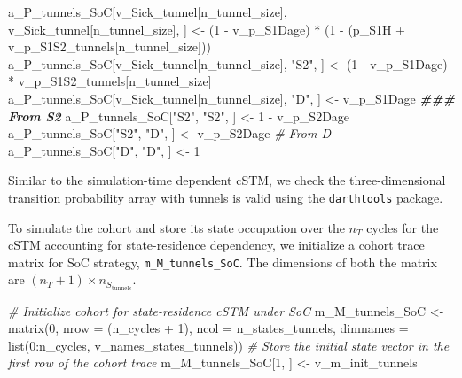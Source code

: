 \documentclass[
]{article}
\newenvironment{Shaded}{\begin{snugshade}}{\end{snugshade}}
\newcommand{\AttributeTok}[1]{\textcolor[rgb]{0.77,0.63,0.00}{#1}}
\newcommand{\CommentTok}[1]{\textcolor[rgb]{0.56,0.35,0.01}{\textit{#1}}}
\newcommand{\DecValTok}[1]{\textcolor[rgb]{0.00,0.00,0.81}{#1}}
\newcommand{\DocumentationTok}[1]{\textcolor[rgb]{0.56,0.35,0.01}{\textbf{\textit{#1}}}}
\newcommand{\FunctionTok}[1]{\textcolor[rgb]{0.00,0.00,0.00}{#1}}
\newcommand{\NormalTok}[1]{#1}
\newcommand{\OtherTok}[1]{\textcolor[rgb]{0.56,0.35,0.01}{#1}}
\newcommand{\SpecialCharTok}[1]{\textcolor[rgb]{0.00,0.00,0.00}{#1}}
\newcommand{\StringTok}[1]{\textcolor[rgb]{0.31,0.60,0.02}{#1}}
\begin{document}
\begin{Shaded}
\begin{Highlighting}[]
\NormalTok{a\_P\_tunnels\_SoC[v\_Sick\_tunnel[n\_tunnel\_size],}
\NormalTok{                v\_Sick\_tunnel[n\_tunnel\_size], ] }\OtherTok{\textless{}{-}}\NormalTok{ (}\DecValTok{1} \SpecialCharTok{{-}}\NormalTok{ v\_p\_S1Dage) }\SpecialCharTok{*}
\NormalTok{                                                   (}\DecValTok{1} \SpecialCharTok{{-}}\NormalTok{ (p\_S1H }\SpecialCharTok{+}\NormalTok{ v\_p\_S1S2\_tunnels[n\_tunnel\_size]))}
\NormalTok{a\_P\_tunnels\_SoC[v\_Sick\_tunnel[n\_tunnel\_size], }\StringTok{"S2"}\NormalTok{, ] }\OtherTok{\textless{}{-}}\NormalTok{ (}\DecValTok{1} \SpecialCharTok{{-}}\NormalTok{ v\_p\_S1Dage) }\SpecialCharTok{*} 
\NormalTok{                                                     v\_p\_S1S2\_tunnels[n\_tunnel\_size]}
\NormalTok{a\_P\_tunnels\_SoC[v\_Sick\_tunnel[n\_tunnel\_size], }\StringTok{"D"}\NormalTok{, ]  }\OtherTok{\textless{}{-}}\NormalTok{ v\_p\_S1Dage}
\DocumentationTok{\#\#\# From S2}
\NormalTok{a\_P\_tunnels\_SoC[}\StringTok{"S2"}\NormalTok{, }\StringTok{"S2"}\NormalTok{, ] }\OtherTok{\textless{}{-}} \DecValTok{1} \SpecialCharTok{{-}}\NormalTok{ v\_p\_S2Dage}
\NormalTok{a\_P\_tunnels\_SoC[}\StringTok{"S2"}\NormalTok{, }\StringTok{"D"}\NormalTok{, ]  }\OtherTok{\textless{}{-}}\NormalTok{ v\_p\_S2Dage}
\CommentTok{\# From D}
\NormalTok{a\_P\_tunnels\_SoC[}\StringTok{"D"}\NormalTok{, }\StringTok{"D"}\NormalTok{, ] }\OtherTok{\textless{}{-}} \DecValTok{1}
\end{Highlighting}
\end{Shaded}

Similar to the simulation-time dependent cSTM, we check the three-dimensional transition probability array with tunnels is valid using the \texttt{darthtools} package.

To simulate the cohort and store its state occupation over the \(n_T\) cycles for the cSTM accounting for state-residence dependency, we initialize a cohort trace matrix for SoC strategy, \texttt{m\_M\_tunnels\_SoC}. The dimensions of both the matrix are \((n_T+1) \times n_{S_{\text{tunnels}}}\).

\begin{Shaded}
\begin{Highlighting}[]
\CommentTok{\# Initialize cohort for state{-}residence cSTM under SoC}
\NormalTok{m\_M\_tunnels\_SoC }\OtherTok{\textless{}{-}} \FunctionTok{matrix}\NormalTok{(}\DecValTok{0}\NormalTok{, }
                      \AttributeTok{nrow =}\NormalTok{ (n\_cycles }\SpecialCharTok{+} \DecValTok{1}\NormalTok{), }\AttributeTok{ncol =}\NormalTok{ n\_states\_tunnels, }
                      \AttributeTok{dimnames =} \FunctionTok{list}\NormalTok{(}\DecValTok{0}\SpecialCharTok{:}\NormalTok{n\_cycles, v\_names\_states\_tunnels))}
\CommentTok{\# Store the initial state vector in the first row of the cohort trace}
\NormalTok{m\_M\_tunnels\_SoC[}\DecValTok{1}\NormalTok{, ] }\OtherTok{\textless{}{-}}\NormalTok{ v\_m\_init\_tunnels}
\end{Highlighting}
\end{Shaded}
\end{document}
